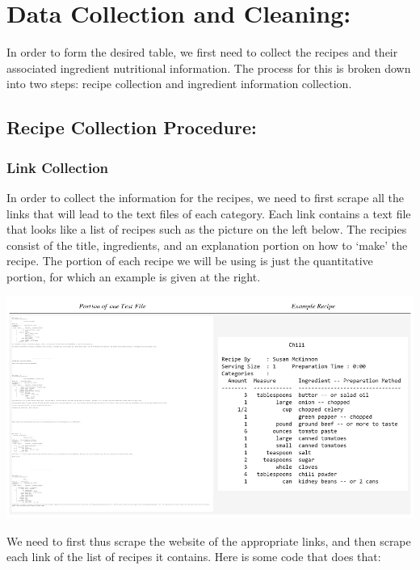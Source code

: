 \documentclass[11pt]{article}
\makeatletter
\def\maxwidth{\ifdim\Gin@nat@width>\linewidth\linewidth
    \else\Gin@nat@width\fi}
\let\Oldincludegraphics\includegraphics
\renewcommand{\includegraphics}[1]{\Oldincludegraphics[width=.8\maxwidth]{#1}}
\makeatother
\begin{document}
    \hypertarget{data-collection-and-cleaning}{%
\section{Data Collection and
Cleaning:}\label{data-collection-and-cleaning}}

In order to form the desired table, we first need to collect the recipes
and their associated ingredient nutritional information. The process for
this is broken down into two steps: recipe collection and ingredient
information collection.

\hypertarget{recipe-collection-procedure}{%
\subsection{Recipe Collection
Procedure:}\label{recipe-collection-procedure}}

\hypertarget{link-collection}{%
\subsubsection{Link Collection}\label{link-collection}}

In order to collect the information for the recipes, we need to first
scrape all the links that will lead to the text files of each category.
Each link contains a text file that looks like a list of recipes such as
the picture on the left below. The recipies consist of the title,
ingredients, and an explanation portion on how to `make' the recipe. The
portion of each recipe we will be using is just the quantitative
portion, for which an example is given at the right.

\includegraphics{2textimg.png}

We need to first thus scrape the website of the appropriate links, and
then scrape each link of the list of recipes it contains. Here is some
code that does that:
\end{document}
